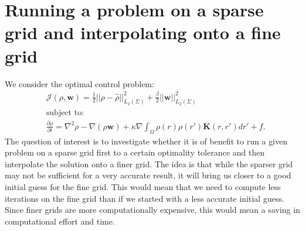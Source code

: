 \documentclass[11pt, a4paper]{article}
\theoremstyle{definition}
\newcommand{\w}{\mathbf{w}}
\newcommand{\K}{\mathbf{K}}
\begin{document}
\section*{Running a problem on a sparse grid and interpolating onto a fine grid}
We consider the optimal control problem:
\begin{align*}
&\mathcal{J}(\rho, \w) = \frac{1}{2}|| \rho - \widehat \rho||^2_{L_2(\Sigma)} + \frac{\beta}{2}|| \w ||^2_{L_2(\Sigma)}\\
&\text{subject to:}\\
&\frac{\partial \rho}{\partial t} = \nabla^2 \rho - \nabla (\rho \w) + \kappa \nabla \int_\Omega \rho(r) \rho(r') \K(r,r') dr' + f.
\end{align*}
The question of interest is to investigate whether it is of benefit to run a given problem on a sparse grid first to a certain optimality tolerance and then interpolate the solution onto a finer grid. The idea is that while the sparser grid may not be sufficient for a very accurate result, it will bring us closer to a good initial guess for the fine grid. This would mean that we need to compute less iterations on the fine grid than if we started with a less accurate initial guess. Since finer grids are more computationally expensive, this would mean a saving in computational effort and time.
\end{document}
